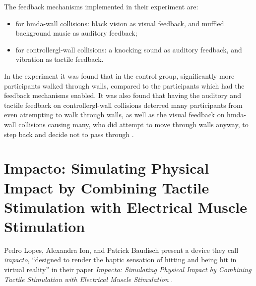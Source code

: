 The feedback mechanisms implemented in their experiment are:
\begin{itemize}
    \item for \gls{hmda}-wall collisions: black vision as visual feedback, and  muffled background music as auditory feedback;
    \item for \gls{controllergl}-wall collisions: a knocking sound as auditory feedback, and vibration as tactile feedback.
\end{itemize}
In the experiment it was found that in the control group, significantly more participants walked through walls, compared to the participants which had the feedback mechanisms enabled. It was also found that having the auditory and tactile feedback on \gls{controllergl}-wall collisions deterred many participants from even attempting to walk through walls, as well as the visual feedback on \gls{hmda}-wall collisions causing many, who did attempt to move through walls anyway, to step back and decide not to pass through \autocite[p. ~6,7]{nonIntrusiveFeedback}.



\section{Impacto: Simulating Physical Impact by Combining Tactile Stimulation with Electrical Muscle Stimulation} \label{section:impacto}

Pedro Lopes, Alexandra Ion, and Patrick Baudisch present a device they call \textit{impacto}, \enquote{designed to render the haptic
sensation of hitting and being hit in virtual reality} \autocite[p. ~1]{impacto} in their paper \textit{Impacto: Simulating Physical Impact by Combining Tactile Stimulation with Electrical Muscle Stimulation} \autocite{impacto}.
\newline


